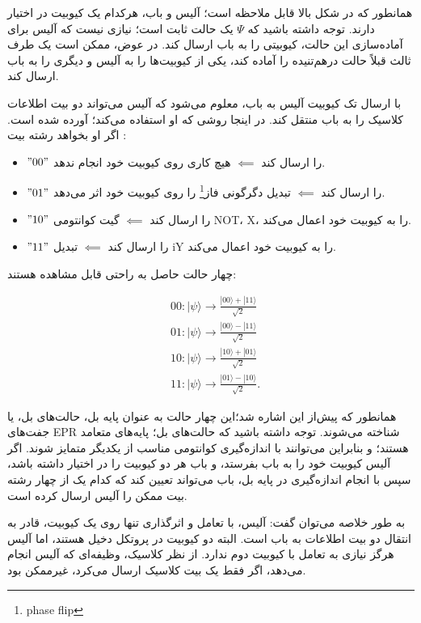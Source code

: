 \documentclass{book}
\begin{document}
همانطور که در شکل بالا قابل ملاحظه است؛ آلیس و باب، هرکدام یک کیوبیت در اختیار دارند. توجه داشته باشید که $\Psi$ یک حالت ثابت است؛ نیازی نیست که آلیس برای آماده‌سازی این حالت، کیوبیتی را به باب ارسال کند. در عوض، ممکن است یک طرف ثالث قبلاً حالت درهم‌تنیده را آماده کند، یکی از کیوبیت‌ها را به آلیس و دیگری را به باب ارسال کند.

با ارسال تک کیوبیت آلیس  به باب، معلوم می‌شود که آلیس می‌تواند دو بیت اطلاعات کلاسیک را به باب منتقل کند. در اینجا روشی که او استفاده می‌کند؛ آورده شده است. اگر او بخواهد رشته بیت :

\begin{itemize}
	\item  $"00"$ را ارسال کند $\impliedby$ هیچ کاری روی کیوبیت خود انجام ندهد.
	\item $"01"$ را ارسال کند $\impliedby$ تبدیل دگرگونی فاز\footnote{phase flip} را روی کیوبیت خود اثر می‌دهد.
	\item  $"10"$ را ارسال کند $\impliedby$ گیت کوانتومی NOT، X، را به کیوبیت خود اعمال می‌کند.
	\item  $"11"$ را ارسال کند $\impliedby$ تبدیل iY را به کیوبیت خود اعمال می‌کند.
\end{itemize}
چهار حالت حاصل به راحتی قابل مشاهده هستند:
\begin{center}
\begin{equation}\label{Alice action superdense}
	\begin{aligned}
		& 00:|\psi\rangle \rightarrow \frac{|00\rangle+|11\rangle}{\sqrt{2}} \\
		& 01:|\psi\rangle \rightarrow \frac{|00\rangle-|11\rangle}{\sqrt{2}} \\
		& 10:|\psi\rangle \rightarrow \frac{|10\rangle+|01\rangle}{\sqrt{2}} \\
		& 11:|\psi\rangle \rightarrow \frac{|01\rangle-|10\rangle}{\sqrt{2}} .
	\end{aligned}
\end{equation}
\end{center}

همانطور که پیش‌از این اشاره شد؛این چهار حالت به عنوان پایه بل، حالت‌های بل، یا جفت‌های EPR شناخته می‌شوند.
 توجه داشته باشید که حالت‌های بل؛ پایه‌های متعامد هستند؛ و بنابراین می‌توانند با اندازه‌گیری کوانتومی مناسب از یکدیگر متمایز شوند. اگر آلیس کیوبیت خود را به باب بفرستد، و باب هر دو کیوبیت را در اختیار داشته باشد، سپس با انجام اندازه‌گیری در پایه بل، باب می‌تواند تعیین کند که کدام یک از چهار رشته بیت ممکن را آلیس ارسال کرده است.

به طور خلاصه می‌توان گفت:
 آلیس، با تعامل و اثرگذاری تنها روی یک کیوبیت، قادر به انتقال دو بیت اطلاعات به باب است. البته دو کیوبیت در پروتکل دخیل هستند، اما آلیس هرگز نیازی به تعامل با کیوبیت دوم ندارد. از نظر کلاسیک، وظیفه‌ای که آلیس انجام می‌دهد، اگر فقط یک بیت کلاسیک ارسال می‌کرد، غیرممکن بود.
\end{document}

